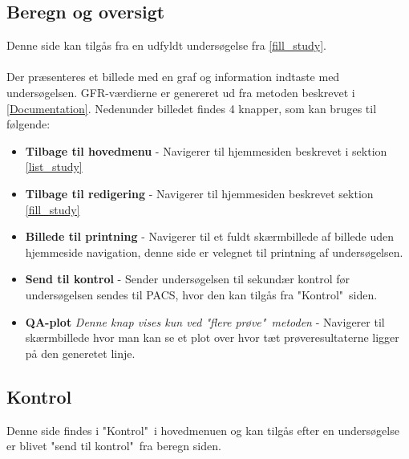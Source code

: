 \documentclass{article}
\begin{document}
\subsection{Beregn og oversigt}\label{present_study}
Denne side kan tilgås fra en udfyldt undersøgelse fra \ref{fill_study}.\\\\
Der præsenteres et billede med en graf og information indtaste med undersøgelsen. GFR-værdierne er genereret ud fra metoden beskrevet i \ref{Documentation}.  Nedenunder billedet findes 4 knapper, som kan bruges til følgende:
\begin{itemize}
	\item \textbf{Tilbage til hovedmenu} - Navigerer til hjemmesiden beskrevet i sektion \ref{list_study}
	\item \textbf{Tilbage til redigering} - Navigerer til hjemmesiden beskrevet sektion \ref{fill_study}
	\item \textbf{Billede til printning} - Navigerer til et fuldt skærmbillede af billede uden hjemmeside navigation, denne side er velegnet til printning af undersøgelsen.
	\item \textbf{Send til kontrol} - Sender undersøgelsen til sekundær kontrol før undersøgelsen sendes til PACS, hvor den kan tilgås fra "Kontrol"\ siden.
	\item \textbf{QA-plot} \textit{Denne knap vises kun ved "flere prøve"\ metoden} - Navigerer til skærmbillede hvor man kan se et plot over hvor tæt prøveresultaterne ligger på den generetet linje.
\end{itemize}

\subsection{Kontrol}
Denne side findes i "Kontrol"\ i hovedmenuen og kan tilgås efter en undersøgelse er blivet "send til kontrol"\ fra beregn siden.\\
\end{document}
